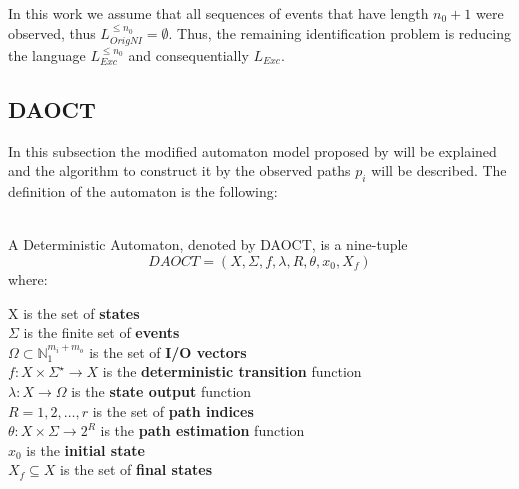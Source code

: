 In this work we assume that all
sequences of events that have length $n_0+1$ were observed, thus
$L_{OrigNI}^{\leq n_0}=\emptyset$.
Thus, the remaining identification problem is reducing the language
$L_{Exc}^{\leq n_0}$ and consequentially $L_{Exc}$.
\newpage
\subsection{DAOCT}
In this subsection the modified automaton model proposed by
\cite{moreira2018enhanced} will be explained and the algorithm to construct it
by the observed paths $p_i$ will be described. 
The definition of the automaton is the following:
\begin{definition}[DAOCT]
  \label{def:daoct}~\\
  A Deterministic Automaton, denoted by DAOCT, is a nine-tuple
  \[ DAOCT = (X,\Sigma,f,\lambda,R,\theta, x_0,X_f)\] where:

  \indent X is the set of \textbf{states} \\
  \indent $\Sigma$ is the finite set of \textbf{events}\\
  \indent $\Omega \subset \mathbb{N}_1^{m_i+m_o} $ is the set of \textbf{I/O vectors}\\
  \indent $f:  X \times \Sigma^\star \rightarrow X$ is the \textbf{deterministic transition} function  \\
  \indent $\lambda : X \rightarrow \Omega$ is the \textbf{state output} function \\
  \indent $R = {1,2,\dots,r}$ is the set of \textbf{path indices} \\
  \indent $\theta : X \times \Sigma \rightarrow 2^R$ is the \textbf{path
    estimation} function \\
  \indent $x_0$ is the \textbf{initial state} \\
  \indent $X_f \subseteq X $ is the set of \textbf{final states}
\end{definition}

